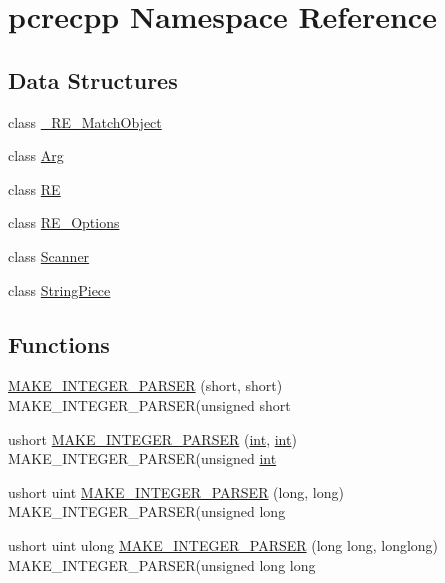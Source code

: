 \hypertarget{namespacepcrecpp}{}\section{pcrecpp Namespace Reference}
\label{namespacepcrecpp}
\subsection*{Data Structures}
\begin{DoxyCompactItemize}
\item 
class \hyperlink{classpcrecpp_1_1__RE__MatchObject}{\+\_\+\+R\+E\+\_\+\+Match\+Object}
\item 
class \hyperlink{classpcrecpp_1_1Arg}{Arg}
\item 
class \hyperlink{classpcrecpp_1_1RE}{RE}
\item 
class \hyperlink{classpcrecpp_1_1RE__Options}{R\+E\+\_\+\+Options}
\item 
class \hyperlink{classpcrecpp_1_1Scanner}{Scanner}
\item 
class \hyperlink{classpcrecpp_1_1StringPiece}{String\+Piece}
\end{DoxyCompactItemize}
\subsection*{Functions}
\begin{DoxyCompactItemize}
\item 
\hyperlink{namespacepcrecpp_a64e231702973b327e9fa5d0e62f1be10}{M\+A\+K\+E\+\_\+\+I\+N\+T\+E\+G\+E\+R\+\_\+\+P\+A\+R\+S\+ER} (short, short) M\+A\+K\+E\+\_\+\+I\+N\+T\+E\+G\+E\+R\+\_\+\+P\+A\+R\+S\+ER(unsigned short
\item 
ushort \hyperlink{namespacepcrecpp_a7a68cdb221f4febfdd20d249c99225d0}{M\+A\+K\+E\+\_\+\+I\+N\+T\+E\+G\+E\+R\+\_\+\+P\+A\+R\+S\+ER} (\hyperlink{pcre_8txt_a42dfa4ff673c82d8efe7144098fbc198}{int}, \hyperlink{pcre_8txt_a42dfa4ff673c82d8efe7144098fbc198}{int}) M\+A\+K\+E\+\_\+\+I\+N\+T\+E\+G\+E\+R\+\_\+\+P\+A\+R\+S\+ER(unsigned \hyperlink{pcre_8txt_a42dfa4ff673c82d8efe7144098fbc198}{int}
\item 
ushort uint \hyperlink{namespacepcrecpp_a480ca1e8208a6ade0b1535ae00f73dd6}{M\+A\+K\+E\+\_\+\+I\+N\+T\+E\+G\+E\+R\+\_\+\+P\+A\+R\+S\+ER} (long, long) M\+A\+K\+E\+\_\+\+I\+N\+T\+E\+G\+E\+R\+\_\+\+P\+A\+R\+S\+ER(unsigned long
\item 
ushort uint ulong \hyperlink{namespacepcrecpp_af17e8fabb051d83da2b87455aeb23c6c}{M\+A\+K\+E\+\_\+\+I\+N\+T\+E\+G\+E\+R\+\_\+\+P\+A\+R\+S\+ER} (long long, longlong) M\+A\+K\+E\+\_\+\+I\+N\+T\+E\+G\+E\+R\+\_\+\+P\+A\+R\+S\+ER(unsigned long long
\end{DoxyCompactItemize}


